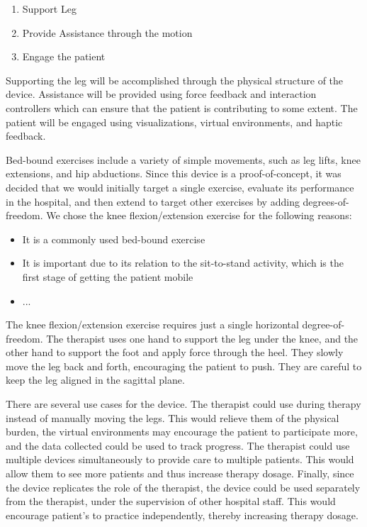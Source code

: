 \documentclass[12pt]{report}
\begin{document}
\begin{enumerate}
	\item Support Leg 
	\item Provide Assistance through the motion
	\item Engage the patient
\end{enumerate}

Supporting the leg will be accomplished through the physical structure of the device. Assistance will be provided using force feedback and interaction controllers which can ensure that the patient is contributing to some extent. The patient will be engaged using visualizations, virtual environments, and haptic feedback. 

Bed-bound exercises include a variety of simple movements, such as leg lifts, knee extensions, and hip abductions. Since this device is a proof-of-concept, it was decided that we would initially target a single exercise, evaluate its performance in the hospital, and then extend to target other exercises by adding degrees-of-freedom. We chose the knee flexion/extension exercise for the following reasons:

\begin{itemize}
	\item It is a commonly used bed-bound exercise
	\item It is important due to its relation to the sit-to-stand activity, which is the first stage of getting the patient mobile
	\item ...
\end{itemize}
 
The knee flexion/extension exercise requires just a single horizontal degree-of-freedom. The therapist uses one hand to support the leg under the knee, and the other hand to support the foot and apply force through the heel. They slowly move the leg back and forth, encouraging the patient to push. They are careful to keep the leg aligned in the sagittal plane. 

There are several use cases for the device. The therapist could use during therapy instead of manually moving the legs. This would relieve them of the physical burden, the virtual environments may encourage the patient to participate more, and the data collected could be used to track progress. The therapist could use multiple devices simultaneously to provide care to multiple patients. This would allow them to see more patients and thus increase therapy dosage. Finally, since the device replicates the role of the therapist, the device could be used separately from the therapist, under the supervision of other hospital staff. This would encourage patient's to practice independently, thereby increasing therapy dosage. 
\end{document}
